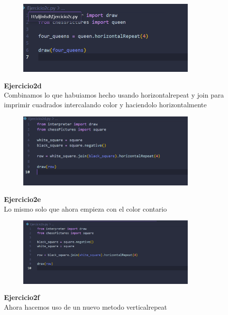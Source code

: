 \documentclass{article}
\begin{document}
    \begin{figure}[H]
		          \centering
		          \includegraphics[width=0.8\textwidth,keepaspectratio]                       {img/Ejc.png}
    \end{figure}


\textbf{Ejercicio2d }
\\Combinamos lo que habuiamos hecho usando horizontalrepeat y join para imprimir cuadrados intercalando color y haciendolo horizontalmente

     \begin{figure}[H]
		          \centering
		          \includegraphics[width=0.8\textwidth,keepaspectratio]                       {img/Ejd.png}
    \end{figure}

\textbf{Ejercicio2e }
\\Lo mismo solo que ahora empieza con el color contario

     \begin{figure}[H]
		          \centering
		          \includegraphics[width=0.8\textwidth,keepaspectratio]                       {img/Eje.png}
    \end{figure}
\textbf{Ejercicio2f }
\\Ahora hacemos uso de un nuevo metodo verticalrepeat
\end{document}

